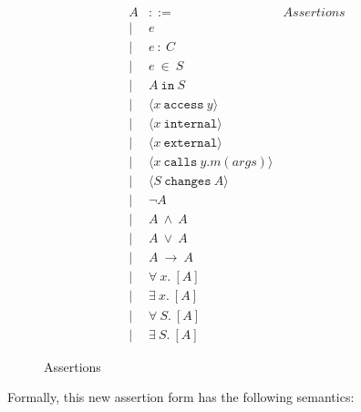 \documentclass[12pt]{article}
\newcommand\mut[3]{\langle #1\ \texttt{mut}\ #2.#3 \rangle}
\newcommand\gives[3]{\langle #1\ \texttt{gives}\ #2\ \texttt{to}\ #3 \rangle}
\newcommand\calls[4]{\langle #1\ \texttt{calls}\ #2.#3(#4) \rangle}
\newcommand\changes[2]{\langle #1\ \texttt{changes}\ #2 \rangle}
\newcommand\access[2]{\langle #1\ \texttt{access}\ #2 \rangle}
\newcommand\internal[1]{\langle #1\ \texttt{internal}\rangle}
\newcommand\external[1]{\langle #1\ \texttt{external}\rangle}
\numberwithin{case}{lemma}
\numberwithin{case}{theorem}
\numberwithin{subcase}{case}
\begin{document}
	\begin{figure}[h]
	\[
	\begin{array}{llr}
	A & ::= & \textit{Assertions}\\  
	| & e & \\
	| & e\ :\ C & \\
	| & e\ \in\ S & \\
	| & A\ \texttt{in}\ S & \\
	| & \access{x}{y} \\
	| & \internal{x} \\
	| & \external{x} \\
	| & \calls{x}{y}{m}{args} \\
	| & \changes{S}{A} \\
	| & \neg A & \\
	| & A\ \wedge\ A & \\
	| & A\ \vee\ A & \\
	| & A\ \longrightarrow\ A & \\
	| & \forall\ x.\ [A] & \\
	| & \exists\ x.\ [A] & \\
	| & \forall\ S.\ [A] & \\
	| & \exists\ S.\ [A] &
	\end{array}
	\]
	\caption{Assertions}
	\label{f:assertions_triple2}
	\end{figure}
Formally, this new assertion form has the following semantics:
\end{document}
